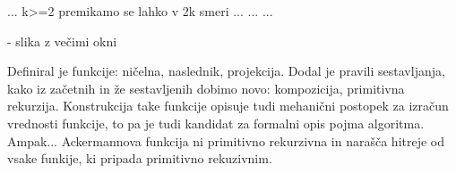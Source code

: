 \documentclass[10pt,a4paper,oneside]{book}
\begin{document}

%

... k>=2
premikamo se lahko v 2k smeri
...
...
...

\fixme - slika z večimi okni



Definiral je funkcije: ničelna, naslednik, projekcija.
Dodal je pravili sestavljanja, kako iz začetnih in že sestavljenih dobimo novo: kompozicija, primitivna rekurzija. %
Konstrukcija take funkcije opisuje tudi mehanični postopek za izračun vrednosti funkcije, to pa je tudi kandidat za formalni opis pojma algoritma.
\br
Ampak... Ackermannova funkcija ni primitivno rekurzivna in narašča hitreje od vsake funkije, ki pripada primitivno rekuzivnim.
\end{document}
